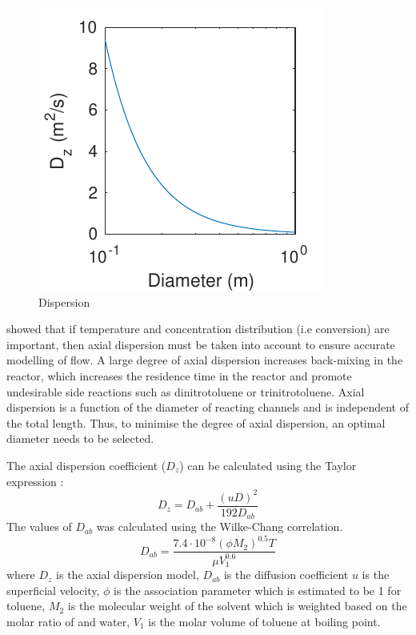 \begin{figure}
    \includegraphics[scale=0.9]{figures/D_z}
    \caption{Dispersion}
    \label{fig:dispersion}
\end{figure}
\textcite{young_axial_1973} showed that if temperature and concentration distribution (i.e conversion) are important, then axial dispersion must be taken into account to ensure accurate modelling of flow. A large degree of axial dispersion increases back-mixing in the reactor, which increases the residence time in the reactor and promote undesirable side reactions such as dinitrotoluene or trinitrotoluene. Axial dispersion is a function of the diameter of reacting channels and is independent of the total length. Thus, to minimise the degree of axial dispersion, an optimal diameter needs to be selected. 

The axial dispersion coefficient ($D_z$) can be calculated using the Taylor expression \cite{froment_chemical_2011}: 
\begin{equation}
    D_z=D_{ab}+\frac{(uD)^2}{192D_{ab}}
    \label{eq: axial dispersion coefficient}
\end{equation}
The values of $D_{ab}$ was calculated using the Wilke-Chang correlation.
\begin{equation}
    D_{ab}=\frac{7.4\cdot 10^{-8}(\phi M_2)^{0.5}T}{\mu V_1^{0.6}}
    \label{wilkechang}
\end{equation}
where $D_z$ is the axial dispersion model, $D_{ab}$ is the diffusion coefficient $u$ is the superficial velocity, $\phi$ is the association parameter which is estimated to be 1 for toluene, $M_2$ is the molecular weight of the solvent which is weighted based on the molar ratio of  and water, $V_1$ is the molar volume of toluene at boiling point.

